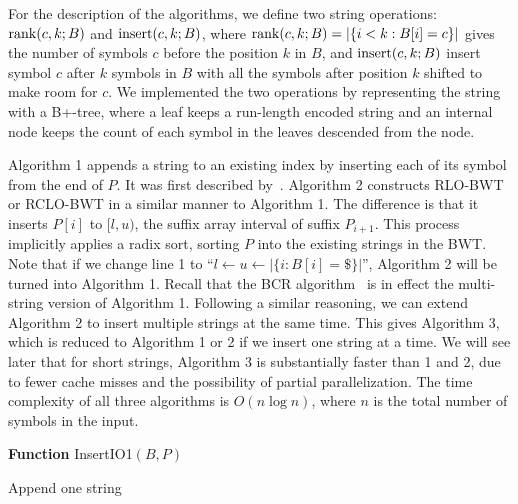 \documentclass{bioinfo}
\begin{document}
\begin{methods}
For the description of the algorithms, we define two string operations: ${\rm
rank}(c,k;B)$ and ${\rm insert}(c,k;B)$, where ${\rm
rank}(c,k;B)=|\{i<k:B[i]=c\}|$ gives the number of symbols $c$ before the
position $k$ in $B$, and ${\rm insert}(c,k;B)$ insert symbol $c$ after $k$
symbols in $B$ with all the symbols after position $k$ shifted to make room for
$c$. We implemented the two operations by representing the string with a
B+-tree, where a leaf keeps a run-length encoded string and an internal node
keeps the count of each symbol in the leaves descended from the node.

Algorithm 1 appends a string to an existing index by inserting each of its
symbol from the end of $P$. It was first described
by~\citet{DBLP:conf/cpm/ChanHL04}. Algorithm 2 constructs RLO-BWT or RCLO-BWT
in a similar manner to Algorithm 1. The difference is that it inserts $P[i]$ to
$[l,u)$, the suffix array interval of suffix $P_{i+1}$. This process implicitly
applies a radix sort, sorting $P$ into the existing strings in the BWT.  Note
that if we change line 1 to ``\mbox{$l\gets u\gets|\{i:B[i]=\$\}|$}'',
Algorithm 2 will be turned into Algorithm 1. Recall that the BCR
algorithm~\citep{DBLP:journals/tcs/BauerCR13} is in effect the multi-string
version of Algorithm 1. Following a similar reasoning, we can extend Algorithm
2 to insert multiple strings at the same time. This gives Algorithm 3, which is
reduced to Algorithm 1 or 2 if we insert one string at a time. We will see
later that for short strings, Algorithm 3 is substantially faster than
1 and 2, due to fewer cache misses and the possibility of partial parallelization.
The time complexity of all three algorithms is $O(n\log n)$, where
$n$ is the total number of symbols in the input.

\begin{algorithm}[ht]
\DontPrintSemicolon
\footnotesize
{}
\BlankLine
\textbf{Function} {\sc InsertIO1}$(B,P)$
\caption{Append one string}
\end{algorithm}


\end{methods}
\end{document}

